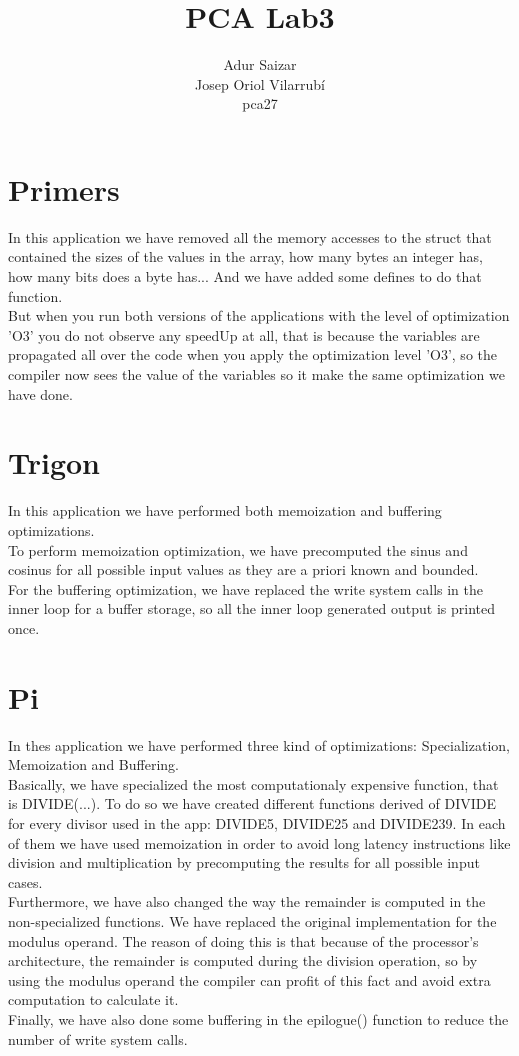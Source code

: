 \documentclass[10pt,a4paper]{article}
\author{Adur Saizar\\ Josep Oriol Vilarrubí\\ pca27}
\title{PCA Lab3}
\begin{document}
\maketitle
\tableofcontents
\pagebreak
\section{Primers}
In this application we have removed all the memory accesses to the struct that contained the sizes of the values in the array, how many bytes an integer has, how many bits does a byte has... And we have added some defines to do that function.\\

But when you run both versions of the applications with the level of optimization 'O3' you do not observe any speedUp at all, that is because the variables are propagated all over the code when you apply the optimization level 'O3', so the compiler now sees the value of the variables so it make the same optimization we have done.

\section{Trigon}
In this application we have performed both memoization and buffering optimizations.\\

To perform memoization optimization, we have precomputed the sinus and cosinus for all possible input values as they are a priori known and bounded.\\

For the buffering optimization, we have replaced the write system calls in the inner loop for a buffer storage, so all the inner loop generated output is printed once.

\section{Pi}
In thes application we have performed three kind of optimizations: Specialization, Memoization and Buffering.\\

Basically, we have specialized the most computationaly expensive function, that is DIVIDE(...). To do so we have created different functions derived of DIVIDE for every divisor used in the app: DIVIDE5, DIVIDE25 and DIVIDE239. In each of them we have used memoization in order to avoid long latency instructions like division and multiplication by precomputing the results for all possible input cases.\\

Furthermore, we have also changed the way the remainder is computed in the non-specialized functions. We have replaced the original implementation for the modulus operand. The reason of doing this is that because of the processor's architecture, the remainder is computed during the division operation, so by using the modulus operand the compiler can profit of this fact and avoid extra computation to calculate it.\\

Finally, we have also done some buffering in the epilogue() function to reduce the number of write system calls.
\end{document}
